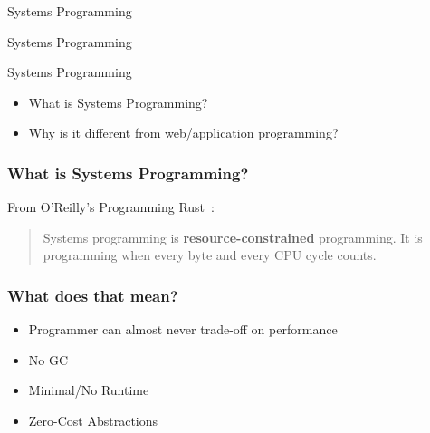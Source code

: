 \begin{section}{Systems Programming}

  \begin{frame}
    \centerline{
      \huge{Systems Programming}
    }
  \end{frame}

  \begin{frame}{Systems Programming}
    \begin{itemize}
    \item What is Systems Programming?
    \item Why is it different from web/application programming?
    \end{itemize}
  \end{frame}

  \begin{frame}
    \frametitle{What is Systems Programming?}
    \begin{block}{From O'Reilly's Programming Rust~\cite{ProgRustPreface1}:}
      \begin{quotation}
        Systems programming is \textbf{resource-constrained}
        programming. It is programming when every byte and every CPU cycle
        counts.
      \end{quotation}
    \end{block}
  \end{frame}

  \begin{frame}
    \frametitle{What does that mean?}
    \begin{itemize}
    \item Programmer can almost never trade-off on performance
    \item No GC
    \item Minimal/No Runtime
    \item Zero-Cost Abstractions~\cite{Stroustrup}
    \end{itemize}
  \end{frame}

\end{section}
